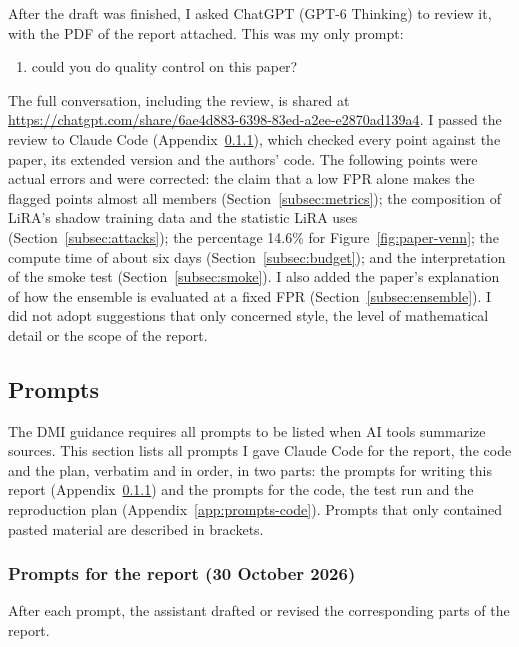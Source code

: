 \documentclass[a4paper]{article}
\newcommand{\prompt}[1]{{\raggedright\small\ttfamily\frenchspacing #1\par}}
\begin{document}
After the draft was finished, I asked ChatGPT (GPT-6 Thinking) to review it, with the PDF of the report attached.
This was my only prompt:
\begin{enumerate}
  \item \prompt{could you do quality control on this paper?}
\end{enumerate}
The full conversation, including the review, is shared at \url{https://chatgpt.com/share/6ae4d883-6398-83ed-a2ee-e2870ad139a4}.
I passed the review to Claude Code (Appendix~\ref{app:prompts-report}), which checked every point against the paper, its extended version and the authors' code.
The following points were actual errors and were corrected: the claim that a low FPR alone makes the flagged points almost all members (Section~\ref{subsec:metrics}); the composition of LiRA's shadow training data and the statistic LiRA uses (Section~\ref{subsec:attacks}); the percentage 14.6\% for Figure~\ref{fig:paper-venn}; the compute time of about six days (Section~\ref{subsec:budget}); and the interpretation of the smoke test (Section~\ref{subsec:smoke}).
I also added the paper's explanation of how the ensemble is evaluated at a fixed FPR (Section~\ref{subsec:ensemble}).
I did not adopt suggestions that only concerned style, the level of mathematical detail or the scope of the report.

\subsection{Prompts}
\label{app:prompt-list}

The DMI guidance requires all prompts to be listed when AI tools summarize sources.
This section lists all prompts I gave Claude Code for the report, the code and the plan, verbatim and in order, in two parts: the prompts for writing this report (Appendix~\ref{app:prompts-report}) and the prompts for the code, the test run and the reproduction plan (Appendix~\ref{app:prompts-code}).
Prompts that only contained pasted material are described in brackets.

\subsubsection{Prompts for the report (30 October 2026)}
\label{app:prompts-report}
After each prompt, the assistant drafted or revised the corresponding parts of the report.
\end{document}
